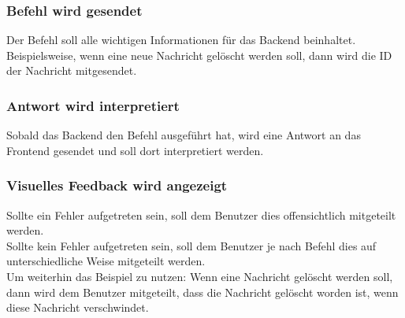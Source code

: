 \subsubsection{Befehl wird gesendet}
Der Befehl soll alle wichtigen Informationen für das Backend beinhaltet. Beispielsweise, wenn eine neue Nachricht gelöscht werden soll, dann wird die ID der Nachricht mitgesendet.

\subsubsection{Antwort wird interpretiert}
Sobald das Backend den Befehl ausgeführt hat, wird eine Antwort an das Frontend gesendet und soll dort interpretiert werden.

\subsubsection{Visuelles Feedback wird angezeigt}
Sollte ein Fehler aufgetreten sein, soll dem Benutzer dies offensichtlich mitgeteilt werden.\\Sollte kein Fehler aufgetreten sein, soll dem Benutzer je nach Befehl dies auf unterschiedliche Weise mitgeteilt werden.\\Um weiterhin das Beispiel zu nutzen: Wenn eine Nachricht gelöscht werden soll, dann wird dem Benutzer mitgeteilt, dass die Nachricht gelöscht worden ist, wenn diese Nachricht verschwindet.